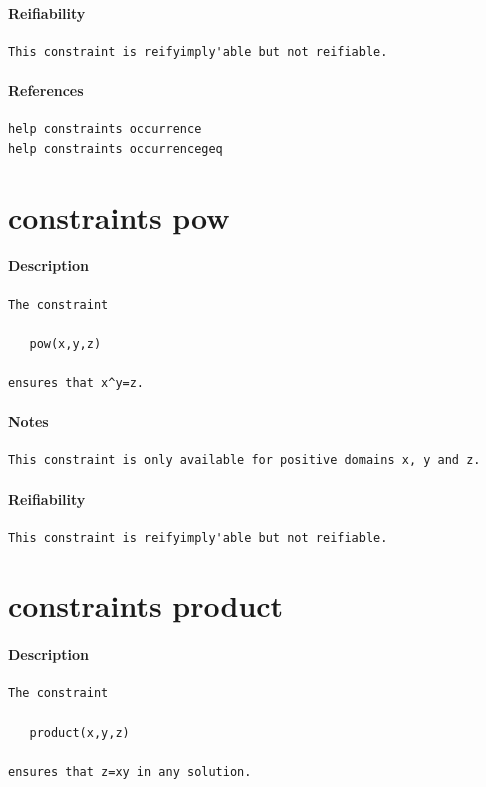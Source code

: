 \documentclass[oneside]{book}
\begin{document}
\paragraph{Reifiability}
{\footnotesize
\begin{verbatim}
This constraint is reifyimply'able but not reifiable.
\end{verbatim}
}
\paragraph{References}
{\footnotesize
\begin{verbatim}
help constraints occurrence
help constraints occurrencegeq
\end{verbatim}
}
\section{constraints pow}
\paragraph{Description}
{\footnotesize
\begin{verbatim}
The constraint
 
   pow(x,y,z)

ensures that x^y=z.
\end{verbatim}
}
\paragraph{Notes}
{\footnotesize
\begin{verbatim}
This constraint is only available for positive domains x, y and z.
\end{verbatim}
}
\paragraph{Reifiability}
{\footnotesize
\begin{verbatim}
This constraint is reifyimply'able but not reifiable.
\end{verbatim}
}
\section{constraints product}
\paragraph{Description}
{\footnotesize
\begin{verbatim}
The constraint

   product(x,y,z)

ensures that z=xy in any solution.
\end{verbatim}
}
\end{document}
